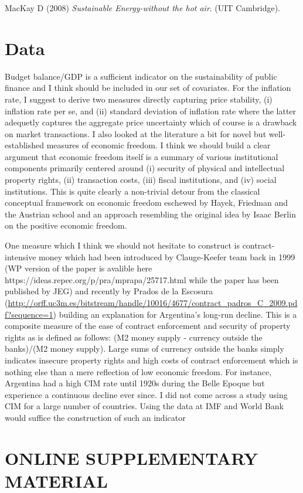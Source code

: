\documentclass[10pt, letterpaper]{article}
\begin{document}
\begin{spacing}{1.0}


%
\begin{thebibliography}{10}

MacKay D (2008) {\em Sustainable Energy-without the hot air}.
\newblock (UIT Cambridge).
\end{thebibliography}

\section{Data}

Budget balance/GDP is a sufficient indicator on the sustainability of public finance and I think should be included in our set of covariates. For the inflation rate, I suggest to derive two measures directly capturing price stability, (i) inflation rate per se, and (ii) standard deviation of inflation rate where the latter adequetly captures the aggregate price uncertainty which of course is a drawback on market transactions. I also looked at the literature a bit for novel but well-established measures of economic freedom. I think we should build a clear argument that economic freedom itself is a summary of various institutional components primarily centered around (i) security of physical and intellectual property rights, (ii) transaction costs, (iii) fiscal institutions, and (iv) social institutions. This is quite clearly a non-trivial detour from the classical conceptual framework on economic freedom eschewed by Hayek, Friedman and the Austrian school and an approach resembling the original idea by Isaac Berlin on the positive economic freedom.

One measure which I think we should not hesitate to construct is contract-intensive money which had been introduced by Clauge-Keefer team back in 1999 (WP version of the paper is avalible here https://ideas.repec.org/p/pra/mprapa/25717.html while the paper has been published by JEG) and recently by Prados de la Escosura (\url{http://orff.uc3m.es/bitstream/handle/10016/4677/contract_padros_C_2009.pdf?sequence=1}) building an explanation for Argentina's long-run decline. This is a composite measure of the ease of contract enforcement and security of property rights as is defined as follows: (M2 money supply - currency outside the banks)/(M2 money supply). Large sums of currency outside the banks simply indicates insecure property rights and high costs of contract enforcement which is nothing else than a mere reflection of low economic freedom. For instance, Argentina had a high CIM rate until 1920s during the Belle Epoque but experience a continuous decline ever since. I did not come across a study using CIM for a large number of countries. Using the data at IMF and World Bank would suffice the construction of such an indicator

\newpage
\section*{\huge ONLINE SUPPLEMENTARY MATERIAL}



\end{spacing}
\end{document}
